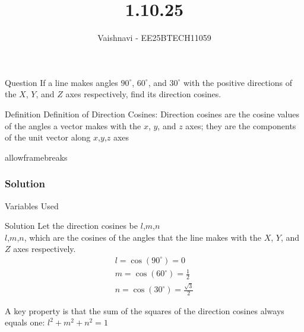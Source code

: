 \documentclass{beamer}
\title %
{1.10.25}
\author %
{Vaishnavi - EE25BTECH11059}
\begin{document}
\frame{\titlepage}
\begin{frame}{Question}
If a line makes angles $90^\circ$, $60^\circ$, and $30^\circ$ with the positive directions of the $X$, $Y$, and $Z$ axes respectively, find its direction cosines.
 

\end{frame}
\begin{frame}{Definition}
Definition of Direction Cosines: Direction cosines are the cosine values of the angles a vector makes with the $x$, $y$, and $z$ axes; they are the components of the unit vector along $x$,$y$,$z$ axes 
\end{frame}
\begin{frame}{allowframebreaks}
\frametitle{Solution}
\begin{table}[H]    
  \centering
  
  \caption{Variables Used}
  \label{tab:1.10.25}
\end{table}

\end{frame}


\begin{frame}{Solution}
Let the direction cosines be 
$l$,$m$,$n$\\
$l$,$m$,$n$, which are the cosines of the angles that the line makes with the $X$, $Y$, and $Z$ axes respectively.\\
\begin{align}
      l = \cos(90^\circ) = 0  \\
      m = \cos(60^\circ) = \frac{1}{2} \\
      n = \cos(30^\circ) = \frac{\sqrt{3}}{2}  
\end{align}
      
      A key property is that the sum of the squares of the direction cosines always equals one:  $l^2 + m^2 + n^2 = 1 $
\end{frame}
\end{document}
